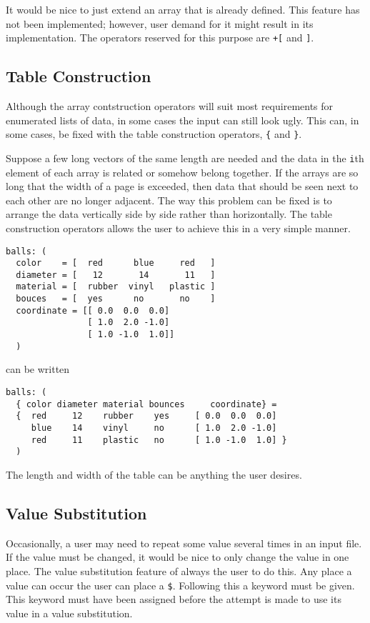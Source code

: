 It would be nice to just extend an array that is already defined.  This
feature has not been implemented; however, user demand for it might
result in its implementation.  The operators reserved for this purpose
are \verb|+[| and \verb|]|.

\subsection{Table Construction}

Although the array contstruction operators will suit most requirements
for enumerated lists of data, in some cases the input can still look
ugly.  This can, in some cases, be fixed with the table construction
operators, \verb|{| and \verb|}|.

Suppose a few long vectors of the same length are needed and the data in
the \verb|i|th element of each array is related or somehow belong
together.  If the arrays are so long that the width of a page is
exceeded, then data that should be seen next to each other are no longer
adjacent.  The way this problem can be fixed is to arrange the data
vertically side by side rather than horizontally.  The table
construction operators allows the user to achieve this in a very simple
manner.
\begin{verbatim}
balls: (
  color    = [  red      blue     red   ]
  diameter = [   12       14       11   ]
  material = [  rubber  vinyl   plastic ]
  bouces   = [  yes      no       no    ]
  coordinate = [[ 0.0  0.0  0.0]
                [ 1.0  2.0 -1.0]
                [ 1.0 -1.0  1.0]]
  )
\end{verbatim}
can be written
\begin{verbatim}
balls: (
  { color diameter material bounces     coordinate} =
  {  red     12    rubber    yes     [ 0.0  0.0  0.0]
     blue    14    vinyl     no      [ 1.0  2.0 -1.0]
     red     11    plastic   no      [ 1.0 -1.0  1.0] }
  )
\end{verbatim}
The length and width of the table can be anything the user desires.

\subsection{Value Substitution}
\label{ParsedKeyVal:valsub}

Occasionally, a user may need to repeat some value several times in an
input file.  If the value must be changed, it would be nice to only
change the value in one place.  The value substitution feature of
 always the user to do this.  Any place a value can
occur the user can place a \verb|$|.  Following this a keyword must be
given.  This keyword must have been assigned before the attempt is made
to use its value in a value substitution.

